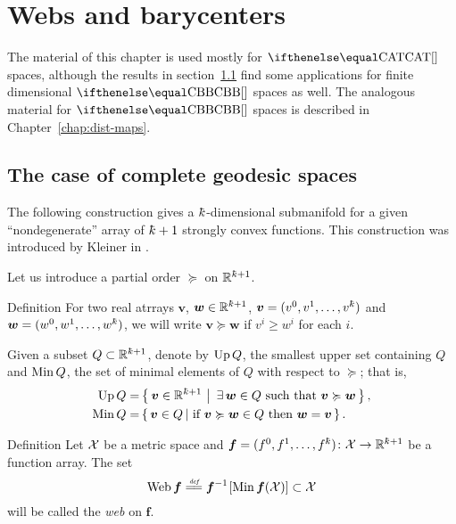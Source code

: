 \chapter{Webs and barycenters %
}\label{chap:web+bary}

The material of this chapter is used mostly for $\CAT{}$ spaces, 
although the results in section~\ref{sec:web-general} find some applications for finite dimensional $\Alex{}$ spaces as well.
The analogous material for $\Alex{}$ spaces is described in Chapter~\ref{chap:dist-maps}.


\section{The case of complete geodesic spaces}\label{sec:web-general}

The following construction gives a $\kay$-dimensional submanifold  
for a given ``nondegenerate'' array of $\kay+1$ strongly convex functions.
This construction was introduced by Kleiner in \cite{kleiner}.

Let us introduce a partial order $\succcurlyeq$ on $\RR^{\kay+1}$.

\begin{thm}{Definition}\label{def:ordung}
For two real atrrays $\bm{v}$, $\bm{w}\in \RR^{\kay+1}$,
$\bm{v}=(v^0,v^1,\dots,v^\kay)$ 
and 
$\bm{w}=(w^0,w^1,\dots,w^\kay)$, 
we will write
$\bm{v}\succcurlyeq\bm{w}$ if $v^i\ge w^i$ for each $i$.
\end{thm}

Given a subset $Q\subset \RR^{\kay+1}$, 
denote by $\mathop{\rm Up}\nolimits Q$,\label{PAGE.def:Up}
the smallest upper set containing $Q$ 
and 
$\mathop{\rm Min}\nolimits Q$, the set of minimal elements of $Q$ with respect to $\succcurlyeq$;
that is,
\begin{align*}
\Up Q 
&=
\set{\bm{v}\in\RR^{\kay+1}}{\exists\, \bm{w}\in Q\ \t{such that}\ \bm{v}\succcurlyeq\bm{w}},
\\
\Min Q 
&=
\set{\bm{v}\in Q}{\t{if}\ \bm{v}\succcurlyeq\bm{w}\in Q\ \t{then}\ \bm{w}=\bm{v}}.
\end{align*}


\begin{thm}{Definition}\label{def:web}
Let $\mathcal{X}$ be a metric space 
and $\bm{f}=(f^0,f^1,\dots,f^\kay)\:\spc{X}\to \RR^{\kay+1}$ be a function array.
The set 
\[\Web\bm{f}
\df
\bm{f}^{-1}\l[\Min\bm{f}(\spc{X})\r]
\subset 
\spc{X}\] 
will be called the \emph{web} on $\bm{f}$.
\end{thm}

